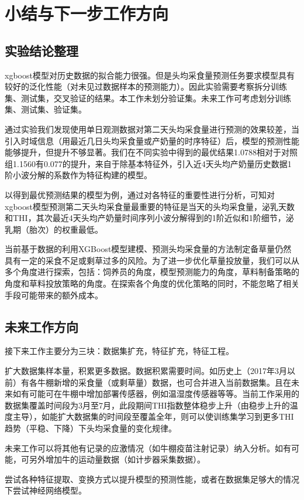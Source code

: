 \section{小结与下一步工作方向}
\label{futurework}

\subsection{实验结论整理}

xgboost模型对历史数据的拟合能力很强。但是头均采食量预测任务要求模型具有较好的泛化性能（对未见过数据样本的预测能力）。因此实验需要考察拆分训练集、测试集，交叉验证的结果。本工作未划分验证集。未来工作可考虑划分训练集、测试集、验证集。


通过实验我们发现使用单日观测数据对第二天头均采食量进行预测的效果较差，当引入时域信息（用最近几日头均采食量或产奶量的时序特征）后，模型的预测性能能够提升，但提升不够显著。我们在不同实验中得到的最优结果1.0788相对于对照组1.1560有0.077的提升，来自于除基本特征外，引入近4天头均产奶量历史数据1阶小波分解的系数作为特征构建的模型。

以得到最优预测结果的模型为例，通过对各特征的重要性进行分析，可知对xgboost模型预测第二天头均采食量最重要的特征是当天的头均采食量，泌乳天数和THI，其次最近4天头均产奶量时间序列小波分解得到的1阶近似和1阶细节，泌乳期（胎次）的权重最低。


当前基于数据的利用XGBoost模型建模、预测头均采食量的方法制定备草量仍然具有一定的采食不足或剩草过多的风险。为了进一步优化草量投放量，我们可以从多个角度进行探索，包括：饲养员的角度，模型预测能力的角度，草料制备策略的角度和草料投放策略的角度。在探索各个角度的优化策略的同时，不能忽略了相关手段可能带来的额外成本。

\subsection{未来工作方向}

接下来工作主要分为三块：数据集扩充，特征扩充，特征工程。

扩大数据集样本量，积累更多数据。数据积累需要时间。如历史上（2017年3月以前）有各牛棚新增的采食量（或剩草量）数据，也可合并进入当前数据集。且在未来如有可能可在牛棚中增加部署传感器，例如温湿度传感器等等。当前工作采用的数据集覆盖时间段为3月至7月，此段期间THI指数整体稳步上升（由稳步上升的温度主导），如能扩大数据集的时间段至覆盖全年，则可以使训练集学习到更多THI趋势（平稳、下降）下头均采食量的变化规律。

未来工作可以将其他有记录的应激情况（如牛棚疫苗注射记录）纳入分析。如有可能，可另外增加牛的运动量数据（如计步器采集数据）。

尝试各种特征提取、变换方式以提升模型的预测性能，或者在数据集足够大的情况下尝试神经网络模型。